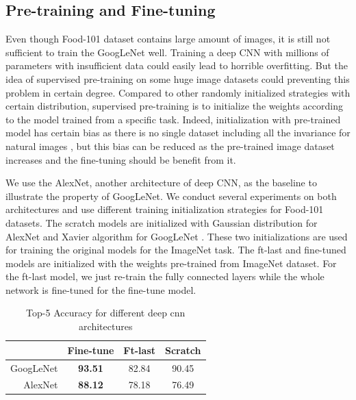 \subsection{Pre-training and Fine-tuning}
Even though Food-101 dataset contains large amount of images, it is still not sufficient to train the GoogLeNet well.
Training a deep CNN with millions of parameters with insufficient data could easily lead to horrible overfitting. But the idea of supervised pre-training on some huge image datasets could preventing this problem in certain degree. Compared to other randomly initialized strategies with certain distribution, supervised pre-training is to initialize the weights according to the model trained from a specific task. Indeed, initialization with pre-trained model has certain bias as there is no single dataset including all the invariance for natural images \cite{agrawal2014analyzing}, but this bias can be reduced as the pre-trained image dataset increases and the fine-tuning should be benefit from it.

We use the AlexNet, another architecture of deep CNN, as the baseline to illustrate the property of GoogLeNet.
We conduct several experiments on both architectures and use different training initialization strategies for Food-101 datasets. The scratch models are initialized with Gaussian distribution for AlexNet and Xavier algorithm for GoogLeNet%
 \cite{glorot2010understanding}. These two initializations are used for training the original models for the ImageNet task. The ft-last and fine-tuned models are initialized with the weights pre-trained from ImageNet dataset. For the ft-last model, we just re-train the fully connected layers while the whole network is fine-tuned for the fine-tune model.
\begin{table}[htbp]
  \centering
  \caption{Top-5 Accuracy for different deep cnn architectures}
    \begin{tabular}{r|ccc}
    \toprule
          & Fine-tune & Ft-last & Scratch \\
    \midrule
    GoogLeNet & \textbf{93.51} & 82.84 & 90.45 \\
    AlexNet & \textbf{88.12} & 78.18 & 76.49 \\
    \bottomrule
    \end{tabular}%
  \label{tab:ft}%
\end{table}%



